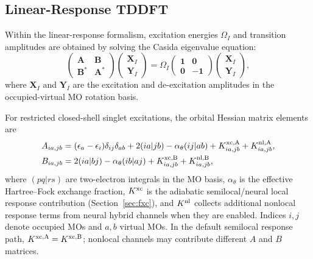 \subsection{Linear-Response TDDFT}
\label{sec:tddft}

Within the linear-response formalism, excitation energies
$\Omega_I$ and transition amplitudes are obtained by solving the
Casida eigenvalue equation:\cite{Casida1995}
\begin{equation}
  \begin{pmatrix}
  \mathbf{A} & \mathbf{B} \\
  \mathbf{B}^* & \mathbf{A}^*
  \end{pmatrix}
  \begin{pmatrix} \mathbf{X}_I \\ \mathbf{Y}_I \end{pmatrix}
  = \Omega_I
  \begin{pmatrix}
  \mathbf{1} & \mathbf{0} \\
  \mathbf{0} & -\mathbf{1}
  \end{pmatrix}
  \begin{pmatrix} \mathbf{X}_I \\ \mathbf{Y}_I \end{pmatrix},
  \label{eq:casida}
\end{equation}
where $\mathbf{X}_I$ and $\mathbf{Y}_I$ are the excitation and
de-excitation amplitudes in the occupied-virtual MO rotation basis.

For restricted closed-shell singlet excitations, the orbital Hessian
matrix elements are
\begin{equation}
  \begin{aligned}
  A_{ia,jb} &=
    (\epsilon_a - \epsilon_i)\delta_{ij}\delta_{ab}
    + 2(ia|jb) - \alpha_\theta(ij|ab)
    + K_{ia,jb}^{\rm xc,A}
    + K_{ia,jb}^{\rm nl,A}, \\
  B_{ia,jb} &=
    2(ia|bj) - \alpha_\theta(ib|aj)
    + K_{ia,jb}^{\rm xc,B}
    + K_{ia,jb}^{\rm nl,B},
  \end{aligned}
  \label{eq:ab-matrix}
\end{equation}
where $(pq|rs)$ are two-electron integrals in the MO basis,
$\alpha_\theta$ is the effective Hartree--Fock exchange fraction,
$K^{\rm xc}$ is the adiabatic semilocal/neural local response
contribution (Section~\ref{sec:fxc}), and $K^{\rm nl}$ collects
additional nonlocal response terms from neural hybrid channels when
they are enabled. Indices $i,j$ denote occupied MOs and $a,b$
virtual MOs. In the default semilocal response path,
$K^{\rm xc,A}=K^{\rm xc,B}$; nonlocal channels may contribute
different $A$ and $B$ matrices.

